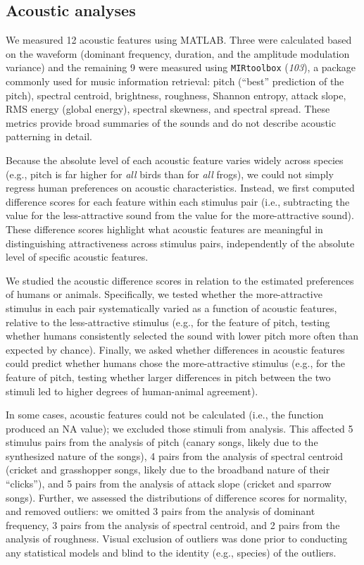 \documentclass[
]{article}
\begin{document}
\subsection{Acoustic analyses}\label{acoustic-analyses}

We measured 12 acoustic features using MATLAB. Three were calculated
based on the waveform (dominant frequency, duration, and the amplitude
modulation variance) and the remaining 9 were measured using
\texttt{MIRtoolbox} (\emph{103}), a package commonly used for music
information retrieval: pitch (``best'' prediction of the pitch),
spectral centroid, brightness, roughness, Shannon entropy, attack slope,
RMS energy (global energy), spectral skewness, and spectral spread.
These metrics provide broad summaries of the sounds and do not describe
acoustic patterning in detail.

Because the absolute level of each acoustic feature varies widely across
species (e.g., pitch is far higher for \emph{all} birds than for
\emph{all} frogs), we could not simply regress human preferences on
acoustic characteristics. Instead, we first computed difference scores
for each feature within each stimulus pair (i.e., subtracting the value
for the less-attractive sound from the value for the more-attractive
sound). These difference scores highlight what acoustic features are
meaningful in distinguishing attractiveness across stimulus pairs,
independently of the absolute level of specific acoustic features.

We studied the acoustic difference scores in relation to the estimated
preferences of humans or animals. Specifically, we tested whether the
more-attractive stimulus in each pair systematically varied as a
function of acoustic features, relative to the less-attractive stimulus
(e.g., for the feature of pitch, testing whether humans consistently
selected the sound with lower pitch more often than expected by chance).
Finally, we asked whether differences in acoustic features could predict
whether humans chose the more-attractive stimulus (e.g., for the feature
of pitch, testing whether larger differences in pitch between the two
stimuli led to higher degrees of human-animal agreement).

In some cases, acoustic features could not be calculated (i.e., the
function produced an NA value); we excluded those stimuli from analysis.
This affected 5 stimulus pairs from the analysis of pitch (canary songs,
likely due to the synthesized nature of the songs), 4 pairs from the
analysis of spectral centroid (cricket and grasshopper songs, likely due
to the broadband nature of their ``clicks''), and 5 pairs from the
analysis of attack slope (cricket and sparrow songs). Further, we
assessed the distributions of difference scores for normality, and
removed outliers: we omitted 3 pairs from the analysis of dominant
frequency, 3 pairs from the analysis of spectral centroid, and 2 pairs
from the analysis of roughness. Visual exclusion of outliers was done
prior to conducting any statistical models and blind to the identity
(e.g., species) of the outliers.
\end{document}
